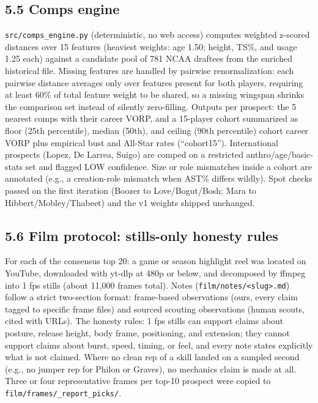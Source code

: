 \documentclass[
  10pt,
]{article}
\begin{document}
\subsection{5.5 Comps engine}\label{comps-engine}

\texttt{src/comps\_engine.py} (deterministic, no web access) computes weighted
z-scored distances over 15 features (heaviest weights: age 1.50; height, TS\%,
and usage 1.25 each) against a candidate pool of 781 NCAA draftees from the
enriched historical file. Missing features are handled by pairwise
renormalization: each pairwise distance averages only over features present for
both players, requiring at least 60\% of total feature weight to be shared, so a
missing wingspan shrinks the comparison set instead of silently zero-filling.
Outputs per prospect: the 5 nearest comps with their career VORP, and a
15-player cohort summarized as floor (25th percentile), median (50th), and
ceiling (90th percentile) cohort career VORP plus empirical bust and All-Star
rates (``cohort15''). International prospects (Lopez, De Larrea, Suigo) are
comped on a restricted anthro/age/basic-stats set and flagged LOW confidence.
Size or role mismatches inside a cohort are annotated (e.g., a creation-role
mismatch when AST\% differs wildly). Spot checks passed on the first iteration
(Boozer to Love/Bogut/Bosh; Mara to Hibbert/Mobley/Thabeet) and the v1 weights
shipped unchanged.

\subsection{5.6 Film protocol: stills-only honesty
rules}\label{film-protocol-stills-only-honesty-rules}

For each of the consensus top 20: a game or season highlight reel was located on
YouTube, downloaded with yt-dlp at 480p or below, and decomposed by ffmpeg into
1 fps stills (about 11,000 frames total). Notes
(\texttt{film/notes/\textless{}slug\textgreater{}.md}) follow a strict
two-section format: frame-based observations (ours, every claim tagged to
specific frame files) and sourced scouting observations (human scouts, cited
with URLs). The honesty rules: 1 fps stills can support claims about posture,
release height, body frame, positioning, and extension; they cannot support
claims about burst, speed, timing, or feel, and every note states explicitly
what is not claimed. Where no clean rep of a skill landed on a sampled second
(e.g., no jumper rep for Philon or Graves), no mechanics claim is made at all.
Three or four representative frames per top-10 prospect were copied to
\texttt{film/frames/\_report\_picks/}.
\end{document}
